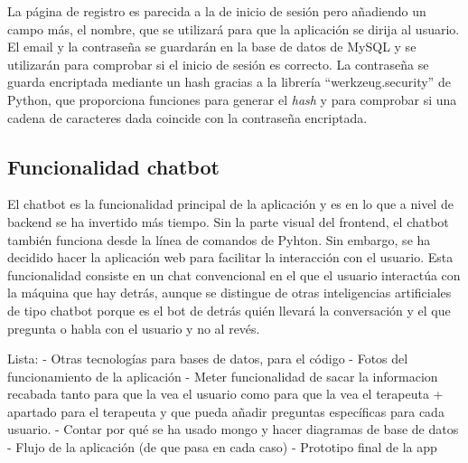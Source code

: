 La página de registro es parecida a la de inicio de sesión pero añadiendo un campo más, el nombre, que se utilizará para que la aplicación se dirija al usuario. El email y la contraseña se guardarán en la base de datos de MySQL y se utilizarán para comprobar si el inicio de sesión es correcto. La contraseña se guarda encriptada mediante un hash gracias a la librería ``werkzeug.security'' de Python, que proporciona funciones para generar el \textit{hash} y para comprobar si una cadena de caracteres dada coincide con la contraseña encriptada.

\subsection{Funcionalidad chatbot}

El chatbot es la funcionalidad principal de la aplicación y es en lo que a nivel de backend se ha invertido más tiempo. Sin la parte visual del frontend, el chatbot también funciona desde la línea de comandos de Pyhton. Sin embargo, se ha decidido hacer la aplicación web para facilitar la interacción con el usuario. Esta funcionalidad consiste en un chat convencional en el que el usuario interactúa con la máquina que hay detrás, aunque se distingue de otras inteligencias artificiales de tipo chatbot porque es el bot de detrás quién llevará la conversación y el que pregunta o habla con el usuario y no al revés. 


Lista: 
- Otras tecnologías para bases de datos, para el código 
- Fotos del funcionamiento de la aplicación 
- Meter funcionalidad de sacar la informacion recabada tanto para que la vea el usuario como para que la vea el terapeuta + apartado para el terapeuta y que pueda añadir preguntas específicas para cada usuario. 
- Contar por qué se ha usado mongo y hacer diagramas de base de datos
- Flujo de la aplicación (de que pasa en cada caso)
- Prototipo final de la app 





